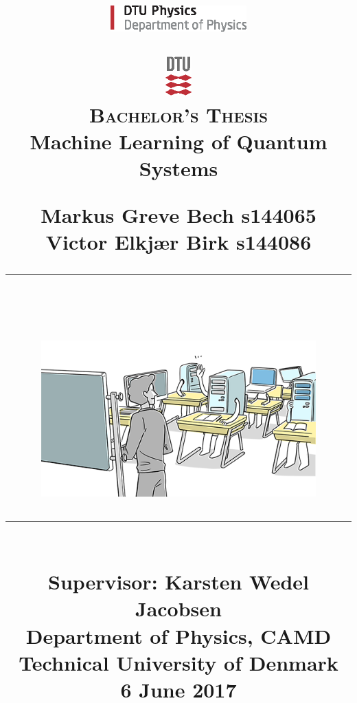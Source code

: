 \title{\normalsize
\vspace*{-50mm}
%
\noindent
\begin{minipage}[b]{20mm} \includegraphics[height=10mm]{figs/chap00/DTU_Physics_logo.eps}\\[-1.5mm] \end{minipage}
\hfill \includegraphics[height=15mm]{figs/chap00/DTULogo.eps} \\[10mm]
%
{\Large\textsc{Bachelor's Thesis}}\\[12mm]
%
{\bf\huge Machine Learning of Quantum Systems}\\[10mm]
%
\author{}
{\large Markus Greve Bech \hfill s144065 }\\
{\large Victor Elkjær Birk \hfill s144086} 
\\[12mm]
%
\rule{\textwidth}{0.5pt}\\[5mm]          %
\centerline{\includegraphics[height=60mm]{figs/chap00/machinelearning.png}} %
\rule{\textwidth}{0.5pt}\\[15mm]         %
Supervisor: Karsten Wedel Jacobsen\\[5mm]          %
Department of Physics, CAMD \\%
Technical University of Denmark\\[3mm]   %
%
6 June 2017    %
\date{}
}

\maketitle
